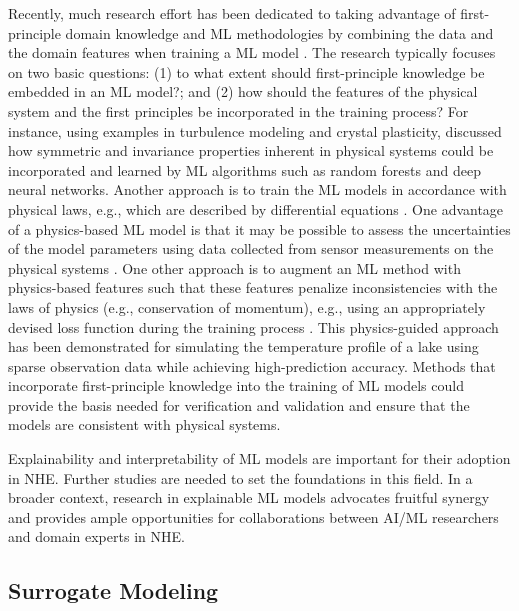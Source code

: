 Recently, much research effort has been dedicated to taking advantage of first-principle domain knowledge and ML methodologies by combining the data and the domain features when training a ML model \citep{willard2020integrating}. The research typically focuses on two basic questions: (1) to what extent should first-principle knowledge be embedded in an ML model?; and (2) how should the features of the physical system and the first principles be incorporated in the training process? For instance, using examples in turbulence modeling and crystal plasticity, \citet{ling2016machine} discussed how symmetric and invariance properties inherent in physical systems could be incorporated and learned by ML algorithms such as random forests and deep neural networks. Another approach is to train the ML models in accordance with physical laws, e.g.,  which are described by differential equations \citep{raissi2019physicsinformed}. One advantage of a physics-based ML model is that it may be possible to assess the uncertainties of the model parameters  using data collected from sensor measurements on the physical systems \citep{zhang2019quantifying}. One other approach is to augment an ML method with physics-based features such that these features penalize inconsistencies with the laws of physics (e.g., conservation of momentum), e.g., using an appropriately devised loss function during the training process \citep{jia2020physicsguided}. This physics-guided approach has been demonstrated for simulating the temperature profile of a lake using sparse observation data while achieving high-prediction accuracy. Methods that incorporate first-principle knowledge into the training of ML models could provide the basis needed for verification and validation and ensure that the models are consistent with physical systems. 

Explainability and interpretability of ML models are important for their adoption in NHE. Further studies are needed to set the foundations in this field. In a broader context, research in explainable ML models advocates fruitful synergy and provides ample opportunities for collaborations between AI/ML researchers and domain experts in NHE.

\subsection{Surrogate Modeling}

